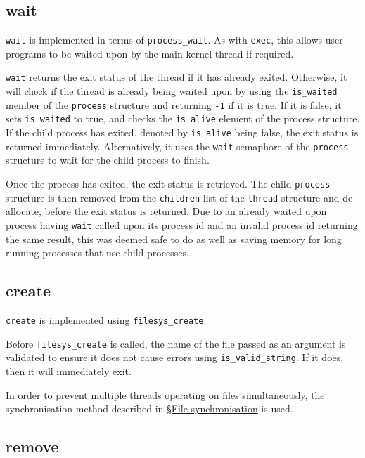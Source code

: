 \documentclass{article}
\begin{document}
\subsection{wait}
\label{sec:wait}

\verb!wait! is implemented in terms of \verb!process_wait!. As with \verb!exec!, this allows user programs to be waited upon by the main kernel thread if required.

\verb!wait! returns the exit status of the thread if it has already exited. Otherwise, it will check if the thread is already being waited upon by using the \verb!is_waited! member of the \verb!process! structure and returning \verb!-1! if it is true. If it is false, it sets \verb!is_waited! to true, and checks the \verb!is_alive! element of the process structure. If the child process has exited, denoted by \verb!is_alive! being false, the exit status is returned immediately. Alternatively, it uses the \verb!wait! semaphore of the \verb!process! structure to wait for the child process to finish.

Once the process has exited, the exit status is retrieved. The child \verb!process! structure is then removed from the \verb!children! list of the \verb!thread! structure and de-allocate, before the exit status is returned. Due to an already waited upon process having \verb!wait! called upon its process id and an invalid process id returning the same result, this was deemed safe to do as well as saving memory for long running processes that use child processes.

\subsection{create}
\label{sec:create}

\verb!create! is implemented using \verb!filesys_create!.

Before \verb!filesys_create! is called, the name of the file passed as an argument is validated to ensure it does not cause errors using \verb!is_valid_string!. If it does, then it will immediately exit.

In order to prevent multiple threads operating on files simultaneously, the synchronisation method described in \hyperref[sec:file-synchronisation]{\S File synchronisation} is used.

\subsection{remove}
\label{sec:remove}
\end{document}
